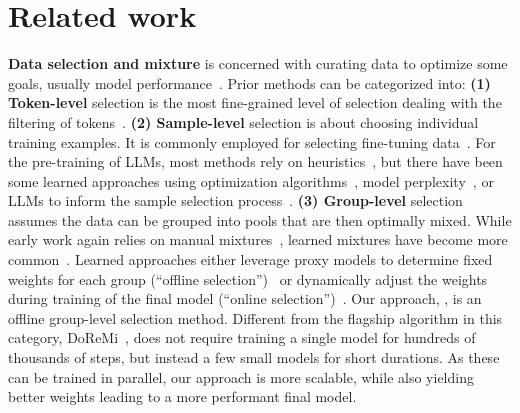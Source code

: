 \section{Related work}

\textbf{Data selection and mixture} is concerned with curating data to optimize some goals, usually model performance~\citep{koh2017understanding,albalak2024survey}. Prior methods can be categorized into: \textbf{(1) Token-level} selection is the most fine-grained level of selection dealing with the filtering of tokens~\citep{lin2024rho1}.
\textbf{(2) Sample-level} selection is about choosing individual training examples. It is commonly employed for selecting fine-tuning data~\citep{thakkar2023self, das2023deft,xie2023data,engstrom2024dsdm,xia2024less, liu2023makes, bukharin2023data,kang2024get,mekala2024smaller, sachin2024selectllm,yang2024smalltolarge}. For the pre-training of LLMs, most methods rely on heuristics~\citep{rae2023gopher,sharma2024text,soldaini2024dolma,li2024datacomplmsearchgenerationtraining}, but there have been some learned approaches using optimization algorithms~\citep{chen2024take,mindermann2022prioritized,shao2024balanced,yu2024mates}, model perplexity~\citep{marion2023investigating,muennighoff2023scaling,zachary2024perplexed}, or LLMs to inform the sample selection process~\citep{alex2024qurating,sachdeva2024train,zhang2024autonomous}. \textbf{(3) Group-level} selection assumes the data can be grouped into pools that are then optimally mixed. While early work again relies on manual mixtures~\citep{the_pile_corpus,gpt3paper}, learned mixtures have become more common~\citep{albalak2024survey}. Learned approaches either leverage proxy models to determine fixed weights for each group (``offline selection'')~\citep{rae2023gopher,xie2023doremi,fan2023doge} or dynamically adjust the weights during training of the final model (``online selection'')~\citep{wang2020balancing, chen2023skill,albalak2023efficient}. Our approach, \ourmethod, is an offline group-level selection method. Different from the flagship algorithm in this category, DoReMi~\citep{xie2023doremi}, \ourmethod does not require training a single model for hundreds of thousands of steps, but instead a few small models for short durations. As these can be trained in parallel, our approach is more scalable, while also yielding better weights leading to a more performant final model.

